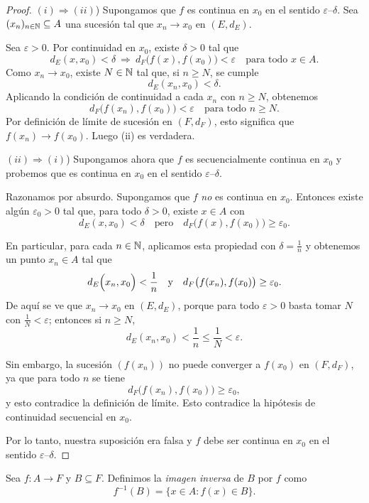 \begin{proof}
$(i) \Rightarrow (ii)$) Supongamos que $f$ es continua en $x_0$ en el sentido
$\varepsilon$--$\delta$. Sea $(x_n)_{n\in\mathbb{N}} \subseteq A$ una sucesión tal que
$x_n \to x_0$ en $(E,d_E)$.

Sea $\varepsilon>0$. Por continuidad en $x_0$, existe $\delta>0$ tal que
\[
d_E(x,x_0) < \delta \ \Rightarrow\ d_F\bigl(f(x),f(x_0)\bigr) < \varepsilon
\quad \text{para todo } x \in A.
\]
Como $x_n \to x_0$, existe $N \in \mathbb{N}$ tal que, si $n \ge N$, se cumple
\[
d_E(x_n,x_0) < \delta.
\]
Aplicando la condición de continuidad a cada $x_n$ con $n \ge N$, obtenemos
\[
d_F\bigl(f(x_n),f(x_0)\bigr) < \varepsilon
\quad \text{para todo } n \ge N.
\]
Por definición de límite de sucesión en $(F,d_F)$, esto significa que
$f(x_n) \to f(x_0)$. Luego (ii) es verdadera.

\medskip

$(ii) \Rightarrow (i)$) Supongamos ahora que $f$ es secuencialmente continua
en $x_0$ y probemos que es continua en $x_0$ en el sentido $\varepsilon$--$\delta$.

Razonamos por absurdo. Supongamos que $f$ \emph{no} es continua en $x_0$.
Entonces existe algún $\varepsilon_0 > 0$ tal que, para todo $\delta > 0$,
existe $x \in A$ con
\[
d_E(x,x_0) < \delta
\quad \text{pero} \quad
d_F\bigl(f(x),f(x_0)\bigr) \ge \varepsilon_0.
\]

En particular, para cada $n \in \mathbb{N}$, aplicamos esta propiedad con
$\delta = \frac{1}{n}$ y obtenemos un punto $x_n \in A$ tal que
\[
d_E\Bigl(x_n,x_0\Bigr) < \frac{1}{n}
\quad \text{y} \quad
d_F\bigl(f(x_n),f(x_0)\bigr) \ge \varepsilon_0.
\]
De aquí se ve que $x_n \to x_0$ en $(E,d_E)$, porque para todo
$\varepsilon>0$ basta tomar $N$ con $\frac{1}{N} < \varepsilon$;
entonces si $n \ge N$,
\[
d_E(x_n,x_0) < \frac{1}{n} \le \frac{1}{N} < \varepsilon.
\]

Sin embargo, la sucesión $(f(x_n))$ no puede converger a $f(x_0)$ en
$(F,d_F)$, ya que para todo $n$ se tiene
\[
d_F\bigl(f(x_n),f(x_0)\bigr) \ge \varepsilon_0,
\]
y esto contradice la definición de límite. Esto contradice la hipótesis
de continuidad secuencial en $x_0$.

Por lo tanto, nuestra suposición era falsa y $f$ debe ser continua
en $x_0$ en el sentido $\varepsilon$--$\delta$.
\end{proof}

\begin{defi}
Sea $f : A \to F$ y $B \subseteq F$. Definimos la \emph{imagen inversa}
de $B$ por $f$ como
\[
f^{-1}(B) = \{x \in A : f(x) \in B\}.
\]
\end{defi}

